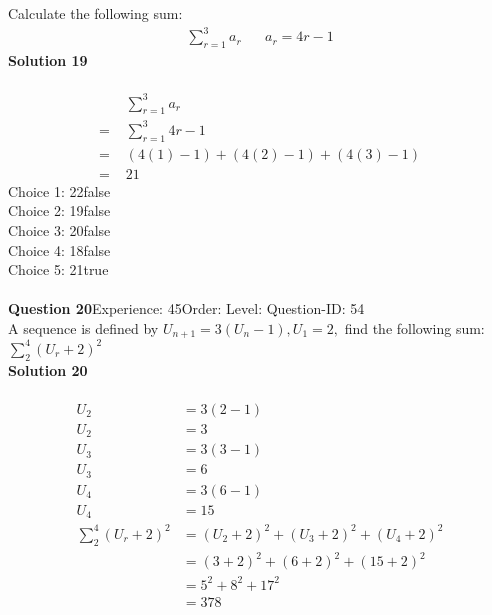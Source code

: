 \documentclass{article}
\begin{document}
Calculate the following sum:
\begin{align*}
\sum_{r=1}^{3} a_r \hspace{20pt}a_r=4r-1
\end{align*}
\noindent\textbf{Solution 19}\\[2pt]
\\[-35pt]\begin{align*}
&\sum_{r=1}^{3} a_r\\[2pt]
=\,\,&\sum_{r=1}^{3} 4r-1\\[2pt]
=\,\,&(4(1)-1)+(4(2)-1)+(4(3)-1) \\[2pt]
=\,\,&21
\end{align*}
Choice 1: \hspace{20pt}22\hspace{20pt}false\\
Choice 2: \hspace{20pt}19\hspace{20pt}false\\
Choice 3: \hspace{20pt}20\hspace{20pt}false\\
Choice 4: \hspace{20pt}18\hspace{20pt}false\\
Choice 5: \hspace{20pt}21\hspace{20pt}true\\
\\[4pt]
\noindent\textbf{Question 20}\hspace{20pt}Experience: 45\hspace{20pt}Order: \hspace{20pt}Level: \hspace{20pt}Question-ID: 54\\[2pt]
A sequence is defined by $U_{n+1}=3(U_n -1), U_1=2,$ find the following sum: $\displaystyle\sum_{2}^{4} (U_r+2)^2$\\[4pt]
\noindent\textbf{Solution 20}\\[2pt]
\\[-35pt]\begin{align*}
U_2&=3(2-1)\\[2pt]
U_2&=3\\[12pt]
U_3&=3(3-1)\\[2pt]
U_3&=6\\[12pt]
U_4&=3(6-1)\\[2pt]
U_4&=15\\[12pt]
\displaystyle\sum_{2}^{4} (U_r+2)^2&=(U_2+2)^2+(U_3+2)^2+(U_4+2)^2\\[2pt]
&=(3+2)^2+(6+2)^2+(15+2)^2\\[2pt]
&=5^2+8^2+17^2\\[2pt]
&=378
\end{align*}
\end{document}
